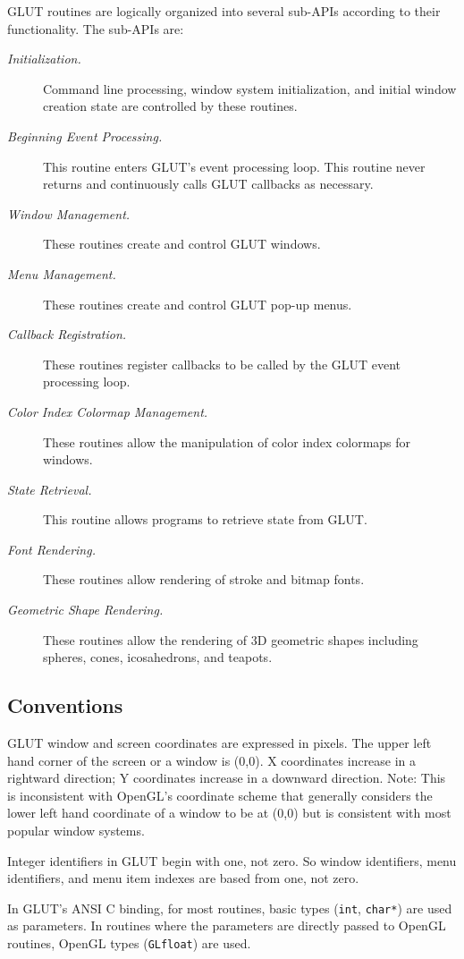 GLUT routines are logically organized into several sub-APIs according
to their functionality.  The sub-APIs are:
\begin{description}
\item[\em Initialization.]
Command line processing,
window system initialization, and initial window creation state are controlled
by these routines.
\item[\em Beginning Event Processing.]
This routine enters GLUT's event processing loop.  This routine never returns
and continuously calls GLUT callbacks as necessary.
\item[\em Window Management.]
These routines create and control GLUT windows.
\item[\em Menu Management.]
These routines create and control GLUT pop-up menus.
\item[\em Callback Registration.]
These routines register callbacks to be called by the GLUT event processing loop.
\item[\em Color Index Colormap Management.]
These routines allow the manipulation of color index colormaps for windows.
\item[\em State Retrieval.]
This routine allows programs to retrieve state from GLUT.
\item[\em Font Rendering.]
These routines allow rendering of stroke and bitmap fonts.
\item[\em Geometric Shape Rendering.]
These routines allow the rendering of 3D geometric shapes including spheres,
cones, icosahedrons, and teapots.
\end{description}

\subsection{Conventions}

GLUT window and screen coordinates are expressed in pixels.  The upper left hand
corner of the screen or a window is (0,0).  X coordinates increase in a
rightward direction; Y coordinates increase in a downward direction.
Note:  This is inconsistent with OpenGL's coordinate scheme that generally
considers the lower left hand coordinate of a window to be at (0,0) but is
consistent with most popular window systems.

Integer identifiers in GLUT begin with one, not zero.  So window identifiers,
menu identifiers, and menu item indexes are based from one, not zero.

In GLUT's ANSI C binding, for most routines, basic types ({\tt int},
{\tt char*}) are used as parameters.  In routines where the parameters
are directly passed to OpenGL routines, OpenGL types ({\tt GLfloat})
are used.

